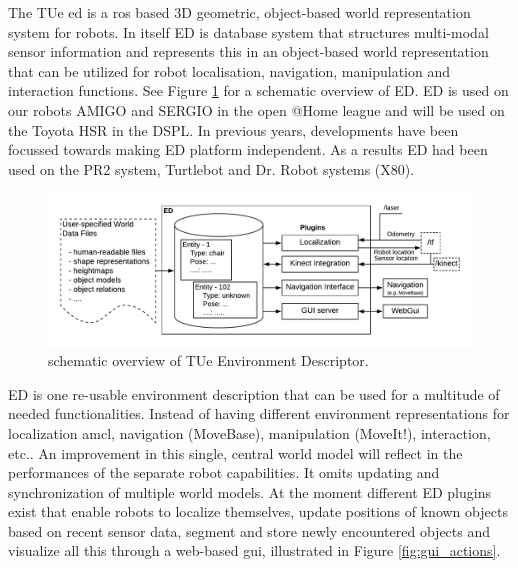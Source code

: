 The TUe \acrfull{ed} is a \acrfull{ros} based 3D geometric, object-based world representation system for robots. In itself ED is database system that structures multi-modal sensor information and represents this in an object-based world representation that can be utilized for robot localisation, navigation, manipulation and interaction functions. See Figure \ref{fig:ed} for a schematic overview of ED. %
ED is used on our robots AMIGO and SERGIO in the open @Home league and will be used on the Toyota HSR in the DSPL. In previous years, developments have been focussed towards making ED platform independent. As a results ED had been used on the PR2 system, Turtlebot and Dr. Robot systems (X80).
\begin{figure}[h]
	\includegraphics[width = 0.9\linewidth]{Figures/ed_overview}
	\caption{schematic overview of TUe Environment Descriptor.}
	\label{fig:ed}
\end{figure}
ED is one re-usable environment description that can be used for a multitude of needed functionalities. Instead of having different environment representations for localization \acrfull{amcl}, navigation (MoveBase), manipulation (MoveIt!), interaction, etc.. An improvement in this single, central world model will reflect in the performances of the separate robot capabilities. It omits updating and synchronization of multiple world models. At the moment different ED plugins exist that enable robots to localize themselves, update positions of known objects based on recent sensor data, segment and store newly encountered objects and visualize all this through a web-based \acrshort{gui}, illustrated in Figure \ref{fig:gui_actions}.
